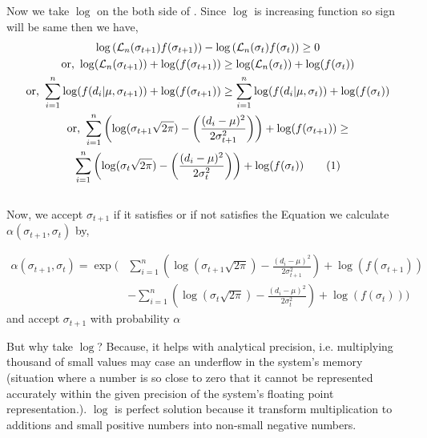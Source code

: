 \begin{example}
    Now we take $ \log $ on the both side of . Since $ \log $ is increasing function so sign will be same then we have,
    \begin{gather*}
        \log \left(  \mathcal{L}_n(\sigma_{t+1})f(\sigma_{t+1}) \right) - \log \left(  \mathcal{L}_n(\sigma_{t})f(\sigma_{t})\right) \ge 0 \\
        \text{or, } \log( \mathcal{L}_n(\sigma_{t+1}) ) + \log(f(\sigma_{t+1})) \ge \log(\mathcal{L}_n(\sigma_t)) + \log(f(\sigma_t)) \\
        \text{or, } \sum_{i=1}^n \log(f(d_i|\mu,\sigma_{t+1})) + \log(f(\sigma_{t+1}))  \ge \sum_{i = 1}^{n} \log(f(d_i|\mu,\sigma_t)) + \log (f(\sigma_t))\\
        \text{or, } \sum_{i = 1}^{n} \left( \log(\sigma_{t+1}\sqrt{2 \pi}) - \left( \frac{(d_i - \mu)^2}{2 \sigma_{t+1}^2} \right) \right) + \log(f(\sigma_{t+1})) \ge \\ \sum_{i = 1}^{n} \left( \log(\sigma_{t}\sqrt{2 \pi}) - \left( \frac{(d_i - \mu)^2}{2 \sigma_{t}^2} \right) \right) + \log(f(\sigma_{t})) \label{eq:2nd accept mh example2} \numberthis
    \end{gather*} \\ 
    Now, we accept $ \sigma_{t+1} $ if it satisfies  or if not satisfies the Equation we calculate $ \alpha(\sigma_{t+1},\sigma_t) $ by,

    \begin{align*}
        \alpha(\sigma_{t+1}, \sigma_t) = \exp \bigg( & \sum_{i=1}^{n} \left( \log(\sigma_{t+1} \sqrt{2 \pi}) - \frac{(d_i - \mu)^2}{2 \sigma_{t+1}^2} \right) + \log(f(\sigma_{t+1})) \\
                                                     & - \sum_{i=1}^{n} \left( \log(\sigma_t \sqrt{2 \pi}) - \frac{(d_i - \mu)^2}{2 \sigma_t^2} \right) + \log(f(\sigma_t)) \bigg)
        \end{align*}
    and accept $ \sigma_{t+1} $ with probability $ \alpha $

    But why take $ \log $? Because, it helps with analytical precision, i.e. multiplying thousand of small values may case an underflow in the system's memory (situation where a number is so close to zero that it cannot be represented accurately within the given precision of the system's floating point representation.). $ \log $ is perfect solution because it transform multiplication to additions and small positive numbers into non-small negative numbers. 


\end{example}

